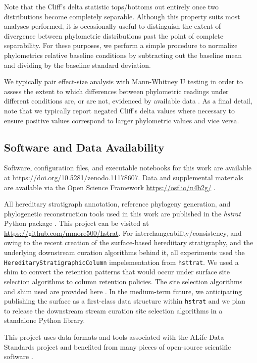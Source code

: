 Note that the Cliff's delta statistic tops/bottoms out entirely once two distributions become completely separable.
Although this property suits most analyses performed, it is occasionally useful to distinguish the extent of divergence between phylometric distributions past the point of complete separability.
For these purposes, we perform a simple procedure to normalize phylometrics relative baseline conditions by subtracting out the baseline mean and dividing by the baseline standard deviation.

We typically pair effect-size analysis with Mann-Whitney U testing in order to assess the extent to which differences between phylometric readings under different conditions are, or are not, evidenced by available data \citep{mann1947on}.
As a final detail, note that we typically report negated Cliff's delta values where necessary to ensure positive values correspond to larger phylometric values and vice versa.

\subsection{Software and Data Availability}

Software, configuration files, and executable notebooks for this work are available at \url{https://doi.org/10.5281/zenodo.11178607}.
Data and supplemental materials are available via the Open Science Framework \url{https://osf.io/n4b2g/} \citep{foster2017open}.

All hereditary stratigraph annotation, reference phylogeny generation, and phylogenetic reconstruction tools used in this work are published in the \textit{hstrat} Python package \citep{moreno2022hstrat}.
This project can be visited at \url{https://github.com/mmore500/hstrat}.
For interchangeability/consistency, and owing to the recent creation of the surface-based herediitary stratigraphy, and the underlying downstream curation algorithms behind it, all experiments used the \texttt{HereditaryStratigraphicColumn} impelementation from \texttt{hsttrat}.
We used a shim to convert the retention patterns that would occur under surface site selection algorithms to column retention policies.
The site selection algorithms and shim used are provided here \citep{moreno2024hsurf}.
In the medium-term future, we anticipating publishing the surface as a first-class data structure within \texttt{hstrat} and we plan to release the downstream stream curation site selection algorithms in a standalone Python library.

This project uses data formats and tools associated with the ALife Data Standards project \citep{lalejini2019data} and benefited from many pieces of open-source scientific software \citep{ofria2020empirical,sand2014tqdist,2020SciPy-NMeth,harris2020array,reback2020pandas,mckinney-proc-scipy-2010,sukumaran2010dendropy,cock2009biopython,dolson2024phylotrackpy,torchiano2016effsize,waskom2021seaborn,hunter2007matplotlib,moreno2024apc,moreno2024qspool,moreno2023teeplot,hagen2021gen3sis,ofria2004avida,torchiano2016effsize}. %